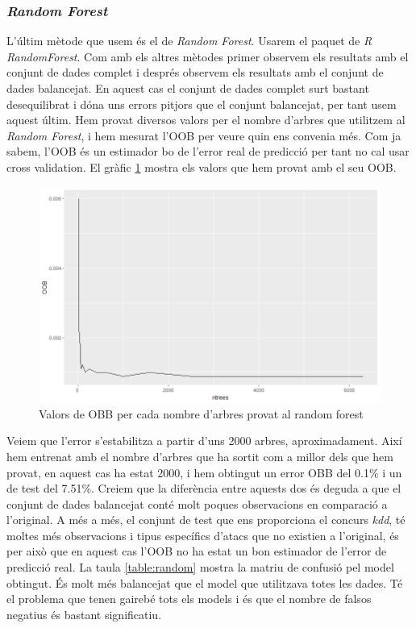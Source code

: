\documentclass[a4paper]{article} %
\begin{document}
\subsubsection{\textit{Random Forest}}
L'últim mètode que usem és el de \textit{Random Forest}. Usarem el paquet de \textit{R} \textit{RandomForest}\cite{rForest}. Com amb els altres mètodes primer observem els resultats amb el conjunt de dades complet i després observem els resultats amb el conjunt de dades balancejat. En aquest cas el conjunt de dades complet surt bastant desequilibrat i dóna uns errors pitjors que el conjunt balancejat, per tant usem aquest últim. Hem provat diversos valors per el nombre d'arbres que utilitzem al \textit{Random Forest}, i hem mesurat l'OOB per veure quin ens convenia més. Com ja sabem, l'OOB és un estimador bo de l'error real de predicció per tant no cal usar cross validation. El gràfic \ref{fig:trees} mostra els valors que hem provat amb el seu OOB.

\begin{figure}[H]
	\centering
	\includegraphics[scale=0.45]{ntrees.png}
	\caption{Valors de OBB per cada nombre d'arbres provat al random forest}
	\label{fig:trees}
\end{figure}

Veiem que l'error s'estabilitza a partir d'uns 2000 arbres, aproximadament. Així hem entrenat amb el nombre d'arbres que ha sortit com a millor dels que hem provat, en aquest cas ha estat 2000, i hem obtingut un error OBB del 0.1\% i un de test del 7.51\%. Creiem que la diferència entre aquests dos és deguda a que el conjunt de dades balancejat conté molt poques observacions en comparació a l'original. A més a més, el conjunt de test que ens proporciona el concurs \textit{kdd}\cite{kdd}, té moltes més observacions i tipus específics d'atacs que no existien a l'original, és per això que en aquest cas l'OOB no ha estat un bon estimador de l'error de predicció real. La taula \ref{table:random} mostra la matriu de confusió pel model obtingut. És molt més balancejat que el model que utilitzava totes les dades. Té el problema que tenen gairebé tots els models i és que el nombre de falsos negatius és bastant significatiu.
\end{document}
